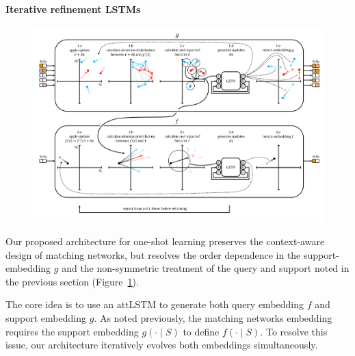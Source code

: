 

\paragraph{Iterative refinement LSTMs}
\begin{figure}[h]
\includegraphics[width=\textwidth]{Images/resiembedding_graphic_v2.png}
\label{fig:resiembed}
\end{figure}

Our proposed architecture for one-shot learning preserves the context-aware design of matching networks, but resolves the order dependence in the support-embedding $g$ and the non-symmetric treatment of the query and support noted in the previous section (Figure~\ref{fig:resiembed}).

The core idea is to use an $\text{attLSTM}$ to generate both query embedding $f$ and support embedding $g$. As noted previously, the matching networks \cite{vinyals2016matching} embedding requires the support embedding $g(\cdot \mid S)$ to define $f(\cdot \mid S)$. To resolve this issue, our architecture iteratively evolves both embeddings simultaneously.

